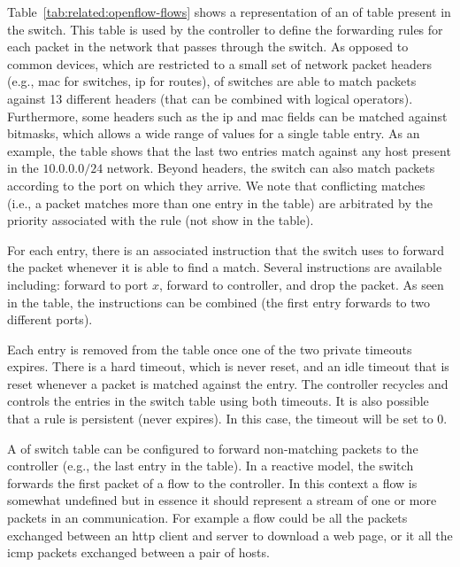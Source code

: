 Table~\ref{tab:related:openflow-flows} shows a representation of an \gls{of} table present in the switch.
This table is used by the controller to define the forwarding rules for each packet in the network that passes through the switch. 
As opposed to common devices, which are restricted to a small set of network packet headers (e.g., \gls{mac} for switches, \gls{ip} for routes), \gls{of} switches are able to match packets against 13 different headers (that can be combined with logical operators).
Furthermore, some headers such as the \gls{ip} and \gls{mac}
 fields can be matched against  bitmasks, which allows  a wide range of values for a single table entry. 
As an example, the table shows that the last two entries match against any host present in the $10.0.0.0/24$ network. 
Beyond headers, the switch can also match packets according to the port on which they arrive. 
We note that conflicting matches (i.e., a packet matches more than one entry in the table) are arbitrated by the priority associated with the rule (not show in the table). 

For each entry, there is an associated instruction that the switch uses to forward the packet whenever it is able to find a match. 
Several instructions are available including: forward to port $x$, forward to controller, and drop the packet. 
As seen in the table, the instructions can be combined (the first entry forwards to two different ports). 


Each entry  is removed from the table once one of the two private timeouts expires. 
There is a hard timeout, which is never reset,  and an  idle timeout that is reset whenever a packet is matched against the entry. 
The controller recycles and controls the entries in the switch table using both timeouts. 
It is also possible that a rule is persistent (never expires). 
In this case, the timeout will be set to 0. 


A \gls{of} switch table can be configured to forward non-matching packets to the controller (e.g.,  the last entry in the table).
In a  reactive model, the switch forwards the first packet of a flow to the controller. 
In this context a  flow is somewhat undefined but in essence it should represent a stream of one or more packets in an communication.
For example a flow could be all the packets exchanged between an \gls{http} client and server to download a web page, or it  all the \gls{icmp} packets exchanged between a pair of hosts. 

